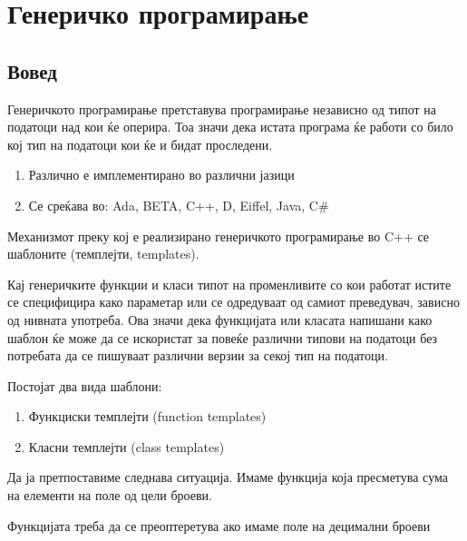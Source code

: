 


\lfoot{}
\cfoot{\thepage}
\rfoot{}
\usepackage{fancyvrb}
\usepackage{xcolor}
\usepackage{textcomp}



\section{Генеричко програмирање}

\subsection{Вовед}

Генеричкото програмирање претставува програмирање независно од типот на податоци
над кои ќе оперира. Тоа значи дека истата програма ќе работи со било кој тип на
податоци кои ќе и бидат проследени.

\begin{enumerate}
  \item Различно е имплементирано во различни јазици
  \item Се среќава во: Ada, BETA, C++, D, Eiffel, Java, C\#  
\end{enumerate}

Механизмот преку кој е реализирано генеричкото програмирање во C++ се шаблоните
(темплејти, templates).

Кај генеричките функции и класи типот на променливите со кои работат истите се
специфицира како параметар или се одредуваат од самиот преведувач, зависно од
нивната употреба. Ова значи дека функцијата или класата напишани како шаблон ќе
може да се искористат за повеќе различни типови на податоци без потребата да се
пишуваат различни верзии за секој тип на податоци.

Постојат два вида шаблони:
\begin{enumerate}
  \item Функциски темплејти (function templates)
  \item Класни темплејти (class templates)  
\end{enumerate}

Да ја претпоставиме следнава ситуација. Имаме функција која пресметува сума на
елементи на поле од цели броеви.



Функцијата треба да се преоптеретува ако имаме поле на децимални броеви


